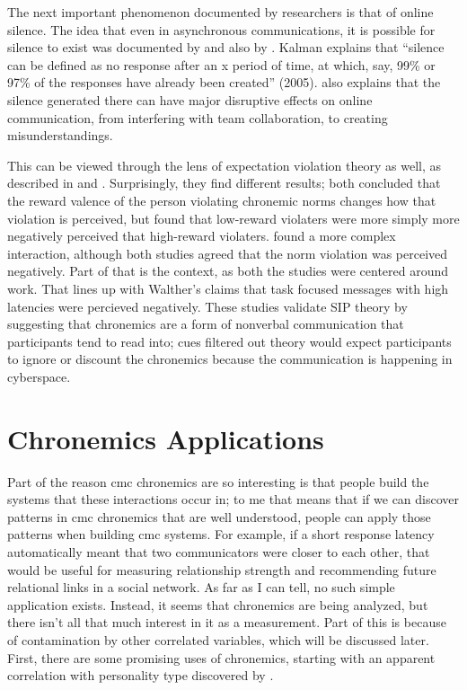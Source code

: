 \documentclass[
  stu]{apa7}
\begin{document}
The next important phenomenon documented by researchers is that of
online silence. The idea that even in asynchronous communications, it is
possible for silence to exist was documented by \textcite{ravid} and
also by \textcite{kalman05}. Kalman explains that ``silence can be
defined as no response after an x period of time, at which, say, 99\% or
97\% of the responses have already been created'' (2005).
\textcite{kalman05} also explains that the silence generated there can
have major disruptive effects on online communication, from interfering
with team collaboration, to creating misunderstandings.

This can be viewed through the lens of expectation violation theory as
well, as described in \textcite{kalman11} and \textcite{sheldon06}.
Surprisingly, they find different results; both concluded that the
reward valence of the person violating chronemic norms changes how that
violation is perceived, but \textcite{sheldon06} found that low-reward
violaters were more simply more negatively perceived that high-reward
violaters. \textcite{kalman11} found a more complex interaction,
although both studies agreed that the norm violation was perceived
negatively. Part of that is the context, as both the studies were
centered around work. That lines up with Walther's claims that task
focused messages with high latencies were percieved negatively. These
studies validate SIP theory by suggesting that chronemics are a form of
nonverbal communication that participants tend to read into; cues
filtered out theory would expect participants to ignore or discount the
chronemics because the communication is happening in cyberspace.

\hypertarget{chronemics-applications}{%
\section{Chronemics Applications}\label{chronemics-applications}}

Part of the reason cmc chronemics are so interesting is that people
build the systems that these interactions occur in; to me that means
that if we can discover patterns in cmc chronemics that are well
understood, people can apply those patterns when building cmc systems.
For example, if a short response latency automatically meant that two
communicators were closer to each other, that would be useful for
measuring relationship strength and recommending future relational links
in a social network. As far as I can tell, no such simple application
exists. Instead, it seems that chronemics are being analyzed, but there
isn't all that much interest in it as a measurement. Part of this is
because of contamination by other correlated variables, which will be
discussed later. First, there are some promising uses of chronemics,
starting with an apparent correlation with personality type discovered
by \textcite{kalman13}.
\end{document}

